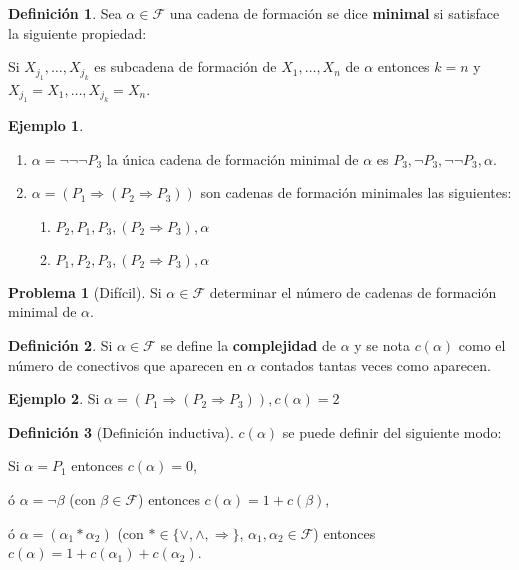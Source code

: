 \documentclass[a4paper,11pt]{article}
\theoremstyle{definition}
\newtheorem{defn}{Definición}[section]
\newtheorem{exap}{Ejemplo}[section]
\newtheorem*{prob}{Problema}
\theoremstyle{remark}
\begin{document}
\begin{defn}
Sea $\alpha \in \mathcal F$ una cadena de formación se dice 
\textbf{minimal} si satisface la siguiente propiedad:

Si $X_{j_1}, \dots, X_{j_k}$ es subcadena de formación de 
$X_1, \dots, X_n$ de $\alpha$ entonces $k = n$ y 
$X_{j_1} = X_1, \dots , X_{j_k} = X_n$.
\end{defn}

\begin{exap}
\begin{enumerate}
\item $\alpha = \neg\neg\neg P_3$ la única cadena de formación minimal
de $\alpha$ es $P_3, \neg P_3, \neg\neg P_3, \alpha$.
\item $\alpha = (P_1 \Rightarrow (P_2 \Rightarrow P_3))$ son cadenas de
formación minimales las siguientes:
\begin{enumerate}[label=\alph*)]
\item $P_2, P_1, P_3, (P_2 \Rightarrow P_3), \alpha$
\item $P_1, P_2, P_3, (P_2 \Rightarrow P_3), \alpha$
\end{enumerate}
\end{enumerate}
\end{exap}

\begin{prob}[Difícil]
Si $\alpha \in \mathcal F$ determinar el número de cadenas
de formación minimal de $\alpha$.
\end{prob}

\begin{defn}
Si $\alpha \in \mathcal F$ se define la \textbf{complejidad} de $\alpha$
y se nota $c(\alpha)$ como el número de conectivos que aparecen
en $\alpha$ contados tantas veces como aparecen.
\end{defn}

\begin{exap}
Si $\alpha = (P_1 \Rightarrow (P_2 \Rightarrow P_3)), c(\alpha) = 2$
\end{exap}

\begin{defn}[Definición inductiva]
$c(\alpha)$ se puede definir del siguiente modo:

Si $\alpha = P_1$ entonces $c(\alpha) = 0$,

ó $\alpha = \neg \beta$ (con $\beta \in \mathcal F$)
entonces $c(\alpha) = 1 + c(\beta)$,

ó $\alpha = (\alpha_1 \ast \alpha_2)$ (con $\ast \in \{\vee, 
\wedge, \Rightarrow \}$, $\alpha_1, \alpha_2 \in \mathcal F$) entonces 
$c(\alpha) = 1 + c(\alpha_1) + c(\alpha_2)$.
\end{defn}
\end{document}

